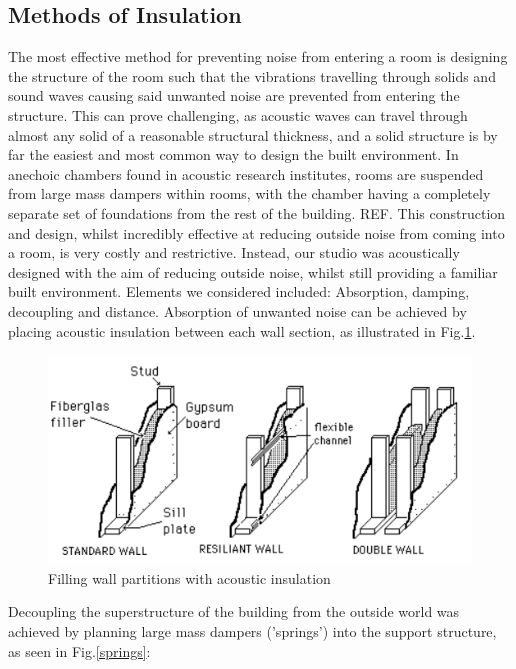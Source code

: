 \documentclass[10pt, twocolumn]{article}
\begin{document}
        \subsection{Methods of Insulation}
            The most effective method for preventing noise from entering a room is designing the structure of the room such that the vibrations travelling through solids and sound waves causing said unwanted noise are prevented from entering the structure.
            This can prove challenging, as acoustic waves can travel through almost any solid of a reasonable structural thickness, and a solid structure is by far the easiest and most common way to design the built environment.
            In anechoic chambers found in acoustic research institutes, rooms are suspended from large mass dampers within rooms, with the chamber having a completely separate set of foundations from the rest of the building. REF.
            This construction and design, whilst incredibly effective at reducing outside noise from coming into a room, is very costly and restrictive.
            Instead, our studio was acoustically designed with the aim of reducing outside noise, whilst still providing a familiar built environment.
            Elements we considered included: Absorption, damping, decoupling and distance.
            Absorption of unwanted noise can be achieved by placing acoustic insulation between each wall section, as illustrated in Fig.\ref{wallFiller}.
            \begin{figure}[H]
                \centering
                \includegraphics[scale = 0.6]{resources/wallFiller.png}
                \caption{Filling wall partitions with acoustic insulation \cite{UCSC}}
                \label{wallFiller}
            \end{figure}
            Decoupling the superstructure of the building from the outside world was achieved by planning large mass dampers ('springs') into the support structure, as seen in Fig.\ref{springs}:
\end{document}
